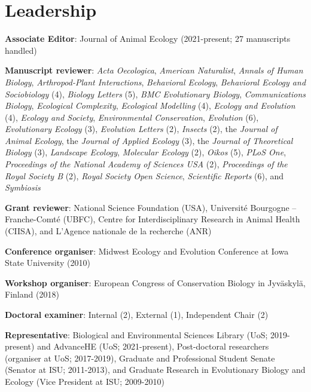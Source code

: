 \documentclass[letterpaper]{article}
\renewenvironment{itemize}{
  \begin{list}{}{
    \setlength{\leftmargin}{1.5em}
  }
}{
  \end{list}
}
\begin{document}
\section*{Leadership}
\begin{itemize}
\item {\bf Associate Editor}: Journal of Animal Ecology (2021-present; 27 manuscripts handled)
\item {\bf Manuscript reviewer}: {\it Acta Oecologica}, {\it American Naturalist}, {\it Annals of Human Biology}, {\it Arthropod-Plant Interactions}, {\it Behavioral Ecology}, {\it Behavioral Ecology and Sociobiology} (4), {\it Biology Letters} (5), {\it BMC Evolutionary Biology}, {\it Communications Biology}, {\it Ecological Complexity}, {\it Ecological Modelling} (4), {\it Ecology and Evolution} (4), {\it Ecology and Society}, {\it Environmental Conservation}, {\it Evolution} (6), {\it Evolutionary Ecology} (3), {\it Evolution Letters} (2), {\it Insects} (2), the {\it Journal of Animal Ecology}, the {\it Journal of Applied Ecology} (3), the {\it Journal of Theoretical Biology} (3), {\it Landscape Ecology}, {\it Molecular Ecology} (2), {\it Oikos} (5), {\it PLoS One}, {\it Proceedings of the National Academy of Sciences USA} (2), {\it Proceedings of the Royal Society B} (2), {\it Royal Society Open Science}, {\it Scientific Reports} (6), and {\it Symbiosis}
\item {\bf Grant reviewer}: National Science Foundation (USA), Universit\'{e} Bourgogne -- Franche-Comt\'{e} (UBFC), Centre for Interdisciplinary Research in Animal Health (CIISA), and L'Agence nationale de la recherche (ANR)
\item {\bf Conference organiser}: Midwest Ecology and Evolution Conference at Iowa State University (2010)
\item {\bf Workshop organiser}: European Congress of Conservation Biology in Jyv\"{a}skyl\"{a}, Finland (2018)
\item {\bf Doctoral examiner}: Internal (2), External (1), Independent Chair (2)
\item {\bf Representative}: Biological and Environmental Sciences Library (UoS; 2019-present) and AdvanceHE (UoS; 2021-present), Post-doctoral researchers (organiser at UoS; 2017-2019), Graduate and Professional Student Senate (Senator at ISU; 2011-2013), and Graduate Research in Evolutionary Biology and Ecology (Vice President at ISU; 2009-2010)
\end{itemize}
\end{document}
